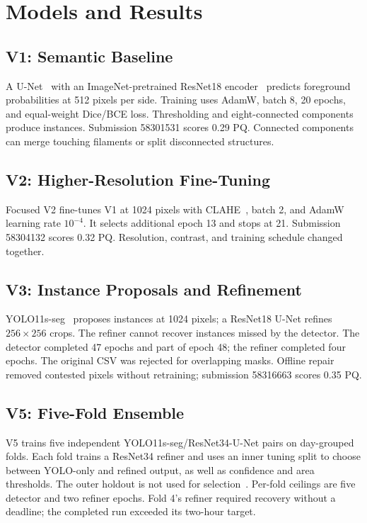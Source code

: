 \documentclass[sigconf]{acmart}
\begin{document}
\section{Models and Results}
\subsection{V1: Semantic Baseline}
A U-Net~\cite{unet} with an ImageNet-pretrained ResNet18 encoder~\cite{resnet}
predicts foreground probabilities at 512 pixels per side. Training uses
AdamW, batch 8, 20 epochs, and equal-weight Dice/BCE loss. Thresholding and
eight-connected components produce instances. Submission 58301531 scores
0.29 PQ. Connected components can merge touching filaments or split
disconnected structures.

\subsection{V2: Higher-Resolution Fine-Tuning}
Focused V2 fine-tunes V1 at 1024 pixels with CLAHE~\cite{opencvclahevisual},
batch 2, and AdamW learning rate $10^{-4}$. It selects additional epoch 13
and stops at 21. Submission 58304132 scores 0.32 PQ. Resolution, contrast,
and training schedule changed together.

\subsection{V3: Instance Proposals and Refinement}
YOLO11s-seg~\cite{ultralyticsvisual} proposes instances at 1024 pixels; a
ResNet18 U-Net refines $256\times256$ crops. The refiner cannot recover
instances missed by the detector. The detector completed 47 epochs and part
of epoch 48; the refiner completed four epochs. The original CSV was rejected
for overlapping masks. Offline repair removed contested pixels without
retraining; submission 58316663 scores 0.35 PQ.

\subsection{V5: Five-Fold Ensemble}
V5 trains five independent YOLO11s-seg/ResNet34-U-Net pairs on day-grouped
folds. Each fold trains a ResNet34 refiner and uses an inner tuning split to
choose between YOLO-only and refined output, as well as confidence and area
thresholds. The outer holdout is not used for
selection~\cite{varma2006}. Per-fold ceilings are five detector and two
refiner epochs. Fold 4's refiner required recovery without a deadline;
the completed run exceeded its two-hour target.
\end{document}
